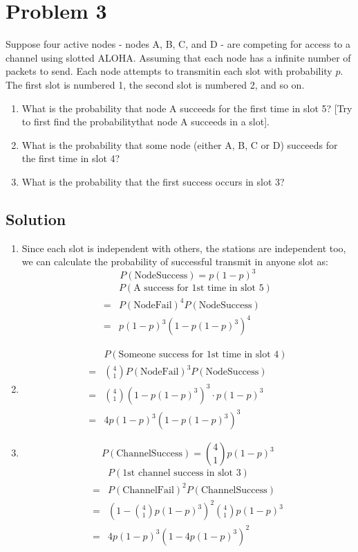 
\section*{Problem 3}

Suppose four active nodes - nodes A, B, C, and D - are competing for access to a channel using slotted ALOHA.
Assuming that each node has a infinite number of packets to send. Each node attempts to transmitin each slot with probability $p$.
The first slot is numbered 1, the second slot is numbered 2, and so on.

\begin{enumerate}
    \item What is the probability that node A succeeds for the first time in slot 5?
          [Try to first find the probabilitythat node A succeeds in a slot].
    \item What is the probability that some node (either A, B, C or D) succeeds for the first time in slot 4?
    \item What is the probability that the first success occurs in slot 3?
\end{enumerate}

\subsection*{Solution}


\begin{enumerate}
    \item Since each slot is independent with others, the stations are independent too, we can calculate the probability of successful transmit in anyone slot as:
          $$P(\text{NodeSuccess}) = p(1-p)^3$$
          \begin{align*}
                & P(\text{A success for 1st time in slot 5}) \\
              = & P(\text{NodeFail})^4P(\text{NodeSuccess})  \\
              = & p(1-p)^3 (1-p(1-p)^3)^4
          \end{align*}

    \item
          \begin{align*}
                & P(\text{Someone success for 1st time in slot 4})       \\
              = & {4 \choose 1}P(\text{NodeFail})^3P(\text{NodeSuccess}) \\
              = & {4 \choose 1}(1-p(1-p)^3)^3 \cdot p(1-p)^3             \\
              = & 4p(1-p)^3(1-p(1-p)^3)^3
          \end{align*}
    \item $$P(\text{ChannelSuccess}) = {4 \choose 1}p(1-p)^3$$
          \begin{align*}
                & P(\text{1st channel success in slot 3})           \\
              = & P(\text{ChannelFail})^2P(\text{ChannelSuccess})   \\
              = & (1- {4 \choose 1}p(1-p)^3)^2{4 \choose 1}p(1-p)^3 \\
              = & 4p(1-p)^3(1-4p(1-p)^3)^2
          \end{align*}
\end{enumerate}